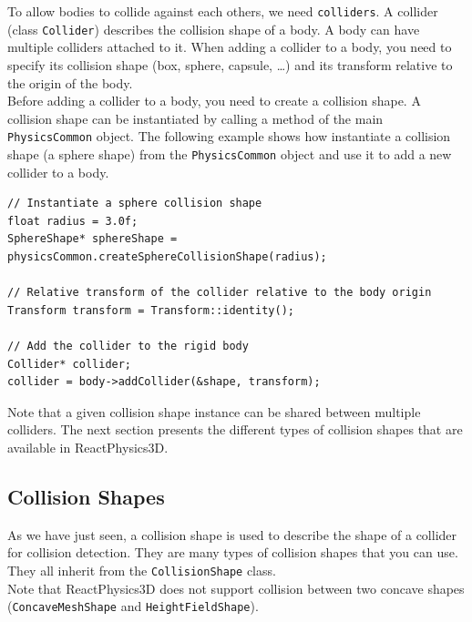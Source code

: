 \documentclass[a4paper,12pt]{article}
\begin{document}
    To allow bodies to collide against each others, we need \texttt{colliders}. A collider (class \texttt{Collider}) describes the collision shape
    of a body. A body can have multiple colliders attached to it. When adding a collider to a body, you need to specify its collision
    shape (box, sphere, capsule, \dots) and its transform relative to the origin of the body. \\

    Before adding a collider to a body, you need to create a collision shape. A collision shape can be instantiated by calling a method of the
    main \texttt{PhysicsCommon} object. The following example shows how instantiate a collision shape (a sphere shape) from the \texttt{PhysicsCommon}
    object and use it to add a new collider to a body. \\

    \begin{lstlisting}
// Instantiate a sphere collision shape
float radius = 3.0f;
SphereShape* sphereShape = physicsCommon.createSphereCollisionShape(radius);

// Relative transform of the collider relative to the body origin
Transform transform = Transform::identity();

// Add the collider to the rigid body
Collider* collider;
collider = body->addCollider(&shape, transform);

  \end{lstlisting}

    \vspace{0.6cm}

    Note that a given collision shape instance can be shared between multiple colliders. The next section presents the different types of collision
    shapes that are available in ReactPhysics3D.

    \subsection{Collision Shapes}
    \label{sec:collisionshapes}

    As we have just seen, a collision shape is used to describe the shape of a collider for collision detection. They are many types of
    collision shapes that you can use. They all inherit from the \texttt{CollisionShape} class. \\

    Note that ReactPhysics3D does not support collision between two concave shapes (\texttt{ConcaveMeshShape} and \texttt{HeightFieldShape}).
\end{document}
